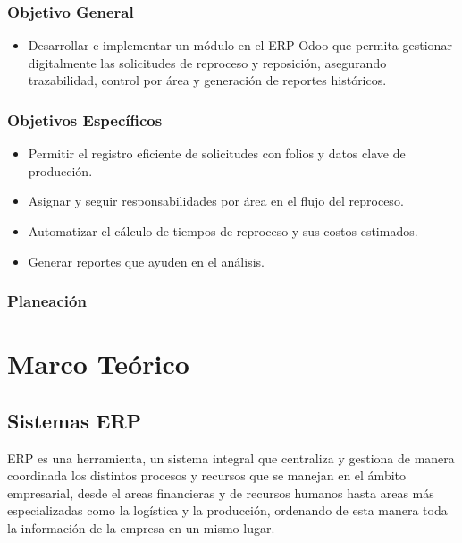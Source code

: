 \documentclass[12pt,letterpaper,spanish]{report}
\begin{document}
\subsection{Objetivo General}
\begin{itemize}
\item Desarrollar e implementar un módulo en el ERP Odoo que permita gestionar digitalmente las solicitudes de reproceso y reposición, asegurando trazabilidad, control por área y generación de reportes históricos.
\end{itemize}
\subsection{Objetivos Específicos}
\begin{itemize}
\item Permitir el registro eficiente de solicitudes con folios y datos clave de producción.
\item Asignar y seguir responsabilidades por área en el flujo del reproceso.
\item Automatizar el cálculo de tiempos de reproceso y sus costos estimados.
\item Generar reportes que ayuden en el análisis.
\end{itemize}
\subsection{Planeación}




\chapter{Marco Teórico}
\newpage

\section{Sistemas ERP}
ERP es una herramienta, un sistema integral que centraliza y gestiona de manera coordinada los distintos procesos y recursos que se manejan en el ámbito empresarial, desde el areas financieras y de recursos humanos hasta areas más especializadas como la logística y la producción, ordenando de esta manera toda la información de la empresa en un mismo lugar.
\end{document}
